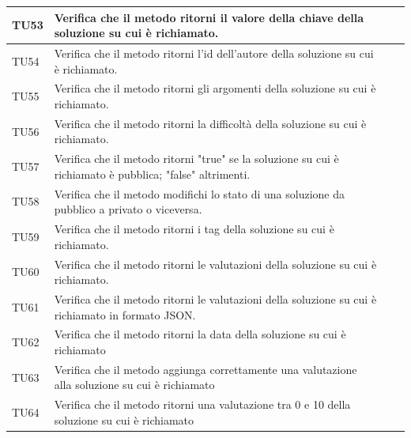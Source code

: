 \begin{longtable}{|>{\centering\arraybackslash}m{1.6cm}|>{\centering\arraybackslash}m{6.41cm}|>{\centering\arraybackslash}m{3.1cm}| c |}
		TU53 & Verifica che il metodo ritorni il valore della chiave della soluzione su cui è richiamato.  \\ \hline
		\rowcolor{LightGray}
		TU54 & Verifica che il metodo ritorni l'id dell'autore della soluzione su cui è richiamato. \\ \hline
		TU55 & Verifica che il metodo ritorni gli argomenti della soluzione su cui è richiamato. \\ \hline
		\rowcolor{LightGray}
		TU56 & Verifica che il metodo ritorni la difficoltà della soluzione su cui è richiamato. \\ \hline
		TU57 & Verifica che il metodo ritorni "true" se la soluzione su cui è richiamato è pubblica; "false" altrimenti. \\ \hline
		\rowcolor{LightGray}
		TU58 & Verifica che il metodo modifichi lo stato di una soluzione da pubblico a privato o viceversa. \\ \hline
		TU59 & Verifica che il metodo ritorni i tag della soluzione su cui è richiamato. \\ \hline
		\rowcolor{LightGray}
		TU60 & Verifica che il metodo ritorni le valutazioni della soluzione su cui è richiamato. \\ \hline
		TU61 & Verifica che il metodo ritorni le valutazioni della soluzione su cui è richiamato in formato JSON.\\ \hline
		\rowcolor{LightGray}
		TU62 & Verifica che il metodo ritorni la data della soluzione su cui è richiamato \\ \hline
		TU63 & Verifica che il metodo aggiunga correttamente una valutazione alla soluzione su cui è richiamato\\ \hline
		\rowcolor{LightGray}
		TU64 & Verifica che il metodo ritorni una valutazione tra 0 e 10 della soluzione su cui è richiamato \\ \hline
		

\end{longtable}
